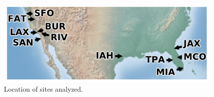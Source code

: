 \documentclass[10pt,a4paper,twocolumn]{article}
\begin{document}
% 
% 

\begin{figure}[ht!]
\centering
\includegraphics{figs/sitemap.pdf}
\caption{\label{fig:sitemap}Location of sites analyzed.}
\end{figure}
\end{document}
